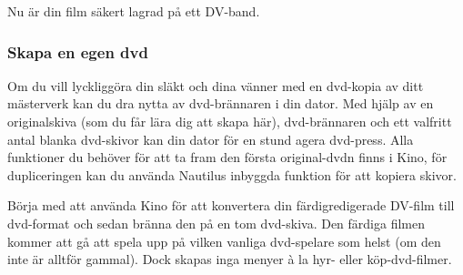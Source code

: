 \documentclass[a4paper,final]{memoir} %
\begin{document}
Nu är din film säkert lagrad på ett DV-band. 


\subsubsection{Skapa en egen dvd}


Om du vill lyckliggöra din släkt och dina vänner med en dvd-kopia av ditt mästerverk kan du dra nytta av dvd-brännaren i din dator. Med hjälp av en  originalskiva (som du får lära dig att skapa här), dvd-brännaren och ett valfritt antal blanka dvd-skivor kan din dator för en stund agera dvd-press. Alla funktioner du behöver för att ta fram den första original-dvdn finns i Kino, för dupliceringen kan du använda Nautilus inbyggda funktion för att kopiera skivor.

Börja med att använda Kino för att konvertera din färdigredigerade DV-film till dvd-format och sedan bränna den på en tom dvd-skiva. Den färdiga filmen kommer att gå att spela upp på vilken vanliga dvd-spelare som helst (om den inte är alltför gammal). Dock skapas inga menyer à la hyr- eller köp-dvd-filmer. 

\end{document}
